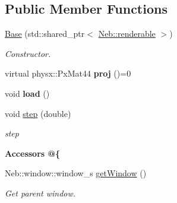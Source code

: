 \subsection*{\-Public \-Member \-Functions}
\begin{DoxyCompactItemize}
\item 
\hypertarget{classNeb_1_1Camera_1_1Projection_1_1Base_a2bf5d7b2b444e405540d1ba3a1dadf87}{\hyperlink{classNeb_1_1Camera_1_1Projection_1_1Base_a2bf5d7b2b444e405540d1ba3a1dadf87}{\-Base} (std\-::shared\-\_\-ptr$<$ \hyperlink{classNeb_1_1renderable}{\-Neb\-::renderable} $>$)}\label{classNeb_1_1Camera_1_1Projection_1_1Base_a2bf5d7b2b444e405540d1ba3a1dadf87}

\begin{DoxyCompactList}\small\item\em \-Constructor. \end{DoxyCompactList}\item 
\hypertarget{classNeb_1_1Camera_1_1Projection_1_1Base_a4101febf5b6540d5e29b9209bcc33f74}{virtual physx\-::\-Px\-Mat44 {\bfseries proj} ()=0}\label{classNeb_1_1Camera_1_1Projection_1_1Base_a4101febf5b6540d5e29b9209bcc33f74}

\item 
\hypertarget{classNeb_1_1Camera_1_1Projection_1_1Base_a4d348ea3fc3134598b02d373a8d081d5}{void {\bfseries load} ()}\label{classNeb_1_1Camera_1_1Projection_1_1Base_a4d348ea3fc3134598b02d373a8d081d5}

\item 
void \hyperlink{classNeb_1_1Camera_1_1Projection_1_1Base_a7a0ef0507f546a0da56bb596de53c962}{step} (double)
\begin{DoxyCompactList}\small\item\em step \end{DoxyCompactList}\end{DoxyCompactItemize}
\begin{Indent}{\bf \-Accessors @\{}\par
\begin{DoxyCompactItemize}
\item 
\hypertarget{classNeb_1_1Camera_1_1Projection_1_1Base_a341df0c373f2c137f37cc9bfab3d00fd}{\-Neb\-::window\-::window\-\_\-s \hyperlink{classNeb_1_1Camera_1_1Projection_1_1Base_a341df0c373f2c137f37cc9bfab3d00fd}{get\-Window} ()}\label{classNeb_1_1Camera_1_1Projection_1_1Base_a341df0c373f2c137f37cc9bfab3d00fd}

\begin{DoxyCompactList}\small\item\em \-Get parent window. \end{DoxyCompactList}\end{DoxyCompactItemize}
\end{Indent}
